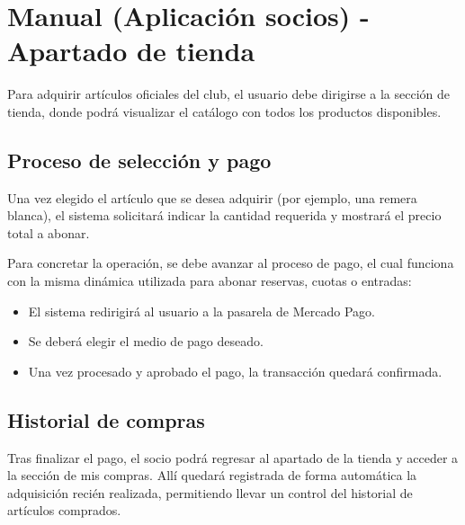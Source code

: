 \section{Manual (Aplicación socios) - Apartado de tienda}

Para adquirir artículos oficiales del club, el usuario debe dirigirse a la sección de tienda, donde podrá visualizar el catálogo con todos los productos disponibles.

\subsection{Proceso de selección y pago}
Una vez elegido el artículo que se desea adquirir (por ejemplo, una remera blanca), el sistema solicitará indicar la cantidad requerida y mostrará el precio total a abonar.

Para concretar la operación, se debe avanzar al proceso de pago, el cual funciona con la misma dinámica utilizada para abonar reservas, cuotas o entradas:
\begin{itemize}
    \item El sistema redirigirá al usuario a la pasarela de Mercado Pago.
    \item Se deberá elegir el medio de pago deseado.
    \item Una vez procesado y aprobado el pago, la transacción quedará confirmada.
\end{itemize}

\subsection{Historial de compras}
Tras finalizar el pago, el socio podrá regresar al apartado de la tienda y acceder a la sección de mis compras. Allí quedará registrada de forma automática la adquisición recién realizada, permitiendo llevar un control del historial de artículos comprados.
